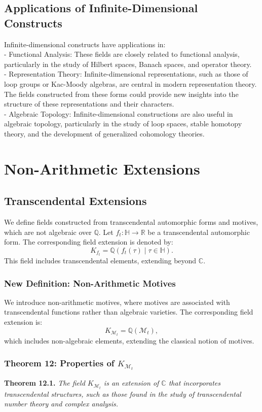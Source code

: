 \documentclass{article}
\begin{document}
\subsection{Applications of Infinite-Dimensional Constructs}
Infinite-dimensional constructs have applications in:
{\ }\\
- Functional Analysis: These fields are closely related to functional analysis, particularly in the study of Hilbert spaces, Banach spaces, and operator theory.
{\ }\\
- Representation Theory: Infinite-dimensional representations, such as those of loop groups or Kac-Moody algebras, are central in modern representation theory. The fields constructed from these forms could provide new insights into the structure of these representations and their characters.
{\ }\\
- Algebraic Topology: Infinite-dimensional constructions are also useful in algebraic topology, particularly in the study of loop spaces, stable homotopy theory, and the development of generalized cohomology theories.

\section{Non-Arithmetic Extensions}
\subsection{Transcendental Extensions}
We define fields constructed from transcendental automorphic forms and motives, which are not algebraic over \(\mathbb{Q}\). Let \(f_t: \mathbb{H} \to \mathbb{R}\) be a transcendental automorphic form. The corresponding field extension is denoted by:
\[
K_{f_t} = \mathbb{Q}(f_t(\tau) \mid \tau \in \mathbb{H}).
\]
This field includes transcendental elements, extending beyond \(\mathbb{C}\).

\subsubsection{New Definition: Non-Arithmetic Motives}
We introduce non-arithmetic motives, where motives are associated with transcendental functions rather than algebraic varieties. The corresponding field extension is:
\[
K_{\mathcal{M}_{t}} = \mathbb{Q}(\mathcal{M}_{t}),
\]
which includes non-algebraic elements, extending the classical notion of motives.

\subsubsection{Theorem 12: Properties of \(K_{\mathcal{M}_{t}}\)}
\textbf{Theorem 12.1.} \textit{The field \(K_{\mathcal{M}_{t}}\) is an extension of \(\mathbb{C}\) that incorporates transcendental structures, such as those found in the study of transcendental number theory and complex analysis.}
\end{document}
